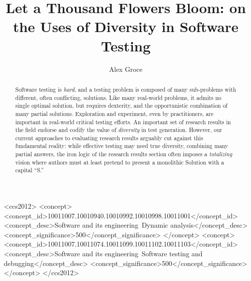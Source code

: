 \documentclass[sigplan,review]{acmart}
\begin{document}
\title{Let a Thousand Flowers Bloom: on the Uses of Diversity in
  Software Testing}

\author{Alex Groce}


\renewcommand{\shortauthors}{Alex Groce}

\begin{abstract}
Software testing is \emph{hard}, and a testing problem is composed of
many sub-problems with different, often conflicting, solutions.  Like many real-world problems, it
admits no single optimal solution, but requires dexterity, and the
opportunistic combination of many partial solutions.  Exploration and
experiment, even by practitioners, are important in real-world
critical testing efforts.  An important set of research results in the
field endorse and codify the value of \emph{diversity} in test generation.
However, our current approaches to evaluating research results
arguably cut against this fundamental reality: while effective testing
may need true diversity, combining many partial answers, the iron
logic of the research results section often imposes a
\emph{totalizing} vision where authors must at least pretend to
present a monolithic Solution with a capital ``S.''
\end{abstract}

\begin{CCSXML}
<ccs2012>
<concept>
<concept_id>10011007.10010940.10010992.10010998.10011001</concept_id>
<concept_desc>Software and its engineering~Dynamic analysis</concept_desc>
<concept_significance>500</concept_significance>
</concept>
<concept>
<concept_id>10011007.10011074.10011099.10011102.10011103</concept_id>
<concept_desc>Software and its engineering~Software testing and debugging</concept_desc>
<concept_significance>500</concept_significance>
</concept>
</ccs2012>
\end{CCSXML}
\end{document}
